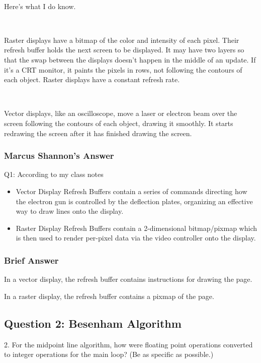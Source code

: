\documentclass[11pt]{article}
\begin{document}
\begin{spacing}{1.2}
\

Here's what I do know.  

\

Raster displays have a bitmap of the color and intensity of each pixel.  Their refresh buffer holds the next screen to be displayed.  It may have two layers so that the swap between the displays doesn't happen in the middle of an update.  If it's a CRT monitor, it paints the pixels in rows, not following the contours of each object.  Raster displays have a constant refresh rate.  

\

Vector displays, like an oscilloscope, move a laser or electron beam over the screen following the contours of each object, drawing it smoothly.  It starts redrawing the screen after it has finished drawing the screen.  

\subsubsection{Marcus Shannon's Answer}

Q1: According to my class notes

\begin{itemize}
    \item Vector Display Refresh Buffers contain a series of commands directing how the electron gun is controlled by the deflection plates, organizing an effective way to draw lines onto the display.
    \item Raster Display Refresh Buffers contain a 2-dimensional bitmap/pixmap which is then used to render per-pixel data via the video controller onto the display.
\end{itemize}

\subsubsection{Brief Answer}

In a vector display, the refresh buffer contains instructions for drawing the page.  

In a raster display, the refresh buffer contains a pixmap of the page.  


\subsection{Question 2:  Besenham Algorithm}
2.  For the midpoint line algorithm, how were floating point operations converted to integer operations for the main loop?  (Be as specific as possible.)


\end{spacing}
\end{document}
